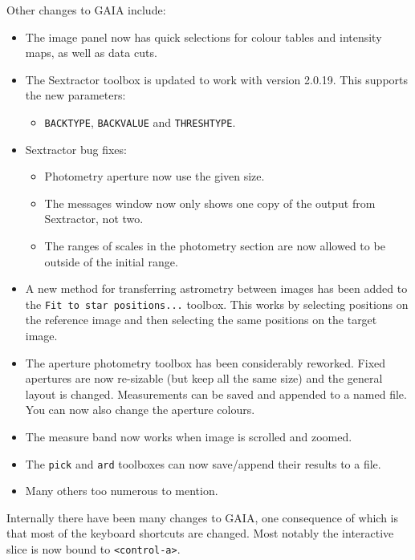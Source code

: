 \documentclass[twoside,11pt]{article}
\renewcommand{\_}{\texttt{\symbol{95}}}
\newcommand{\mytt}[1]{{\tt{#1}}}
\begin{document}
  Other changes to GAIA include:
  \begin{itemize}
    \item The image panel now has quick selections for colour tables and
      intensity maps, as well as data cuts.

    \item The Sextractor toolbox is updated to work with version 2.0.19.
      This supports the new parameters:
        \begin{itemize}
           \item \mytt{BACK\_TYPE}, \mytt{BACK\_VALUE} and \mytt{THRESH\_TYPE}.
        \end{itemize} 

    \item Sextractor bug fixes:
        \begin{itemize}
          \item Photometry aperture now use the given size.
          \item The messages window now only shows one copy of
                the output from Sextractor, not two.
          \item The ranges of scales in the photometry section are
                now allowed to be outside of the initial range.
        \end{itemize}

    \item A new method for transferring astrometry between images has been
      added to the \mytt{Fit to star positions...} toolbox. This works by
      selecting positions on the reference image and then selecting the
      same positions on the target image.

    \item The aperture photometry toolbox has been considerably
      reworked. Fixed apertures are now re-sizable (but keep all the
      same size) and the general layout is changed. Measurements can
      be saved and appended to a named file. You can now also change
      the aperture colours.

    \item The measure band now works when image is scrolled and zoomed.

    \item  The \mytt{pick} and \mytt{ard} toolboxes can now
           save/append their results to a file.

    \item Many others too numerous to mention.
\end{itemize}
Internally there have been many changes to GAIA, one consequence of
which is that most of the keyboard shortcuts are changed. Most
notably the interactive slice is now bound to \mytt{<control-a>}.
\end{document}
